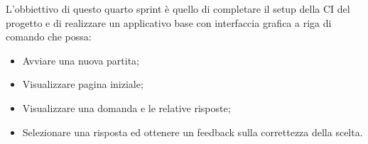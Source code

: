 L'obbiettivo di questo quarto sprint è quello di completare il setup della CI del progetto e di realizzare un applicativo base con interfaccia grafica a riga di comando che possa:
\begin{itemize}
    \item Avviare una nuova partita;
    \item Visualizzare pagina iniziale;
    \item Visualizzare una domanda e le relative risposte;
    \item Selezionare una risposta ed ottenere un feedback sulla correttezza della scelta.
\end{itemize} 


